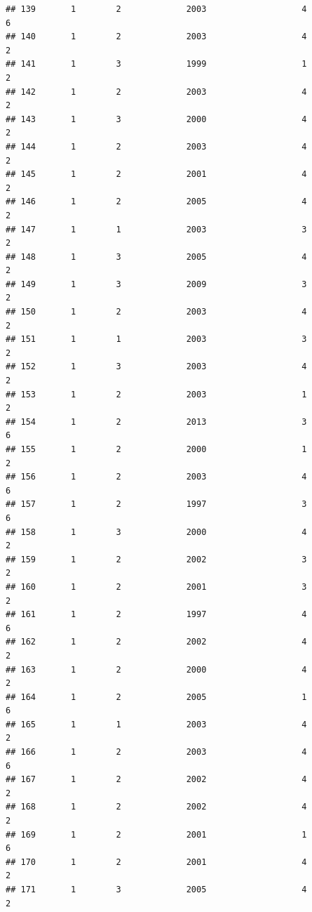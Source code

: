 \documentclass[
]{article}
\begin{document}
\begin{verbatim}
## 139       1        2             2003                   4                 6
## 140       1        2             2003                   4                 2
## 141       1        3             1999                   1                 2
## 142       1        2             2003                   4                 2
## 143       1        3             2000                   4                 2
## 144       1        2             2003                   4                 2
## 145       1        2             2001                   4                 2
## 146       1        2             2005                   4                 2
## 147       1        1             2003                   3                 2
## 148       1        3             2005                   4                 2
## 149       1        3             2009                   3                 2
## 150       1        2             2003                   4                 2
## 151       1        1             2003                   3                 2
## 152       1        3             2003                   4                 2
## 153       1        2             2003                   1                 2
## 154       1        2             2013                   3                 6
## 155       1        2             2000                   1                 2
## 156       1        2             2003                   4                 6
## 157       1        2             1997                   3                 6
## 158       1        3             2000                   4                 2
## 159       1        2             2002                   3                 2
## 160       1        2             2001                   3                 2
## 161       1        2             1997                   4                 6
## 162       1        2             2002                   4                 2
## 163       1        2             2000                   4                 2
## 164       1        2             2005                   1                 6
## 165       1        1             2003                   4                 2
## 166       1        2             2003                   4                 6
## 167       1        2             2002                   4                 2
## 168       1        2             2002                   4                 2
## 169       1        2             2001                   1                 6
## 170       1        2             2001                   4                 2
## 171       1        3             2005                   4                 2

\end{verbatim}
\end{document}
